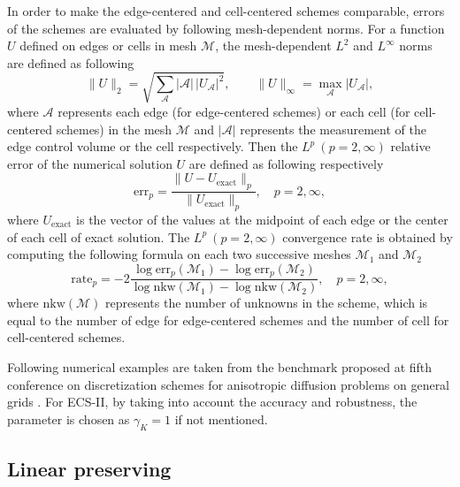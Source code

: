 \documentclass[times,review,preprint]{elsarticle}
\begin{document}
In order to make the edge-centered and cell-centered schemes comparable, errors of the schemes are evaluated by following mesh-dependent norms.
For a function $U$ defined on edges or cells in mesh $\mathcal{M}$, the mesh-dependent $L^2$ and $L^{\infty}$ norms are defined as following
\begin{equation}
\|U\|_{2} = \sqrt{ \sum_{\mathcal{A}} |\mathcal{A}| \, |U_{\mathcal{A}}|^2 }, \qquad \|U\|_{\infty} = \max_{\mathcal{A}} |U_{\mathcal{A}}|,
\end{equation}
where $\mathcal{A}$ represents each edge (for edge-centered schemes) or each cell (for cell-centered schemes) in the mesh $\mathcal{M}$ and $|\mathcal{A}|$ represents the measurement of the edge control volume or the cell respectively.
Then the $L^p \ (p = 2, \infty)$ relative error of the numerical solution $U$ are defined as following respectively
\begin{equation}
\text{err}_{p} = \frac{\|U - U_{\text{exact}}\|_{p}}{\|U_{\text{exact}}\|_{p}}, \quad p = 2, \infty,
\end{equation}
where $U_{\text{exact}}$ is the vector of the values at the midpoint of each edge or the center of each cell of exact solution.
The $L^p \ (p = 2, \infty)$ convergence rate is obtained by computing the following formula on each two successive meshes $\mathcal{M}_1$ and $\mathcal{M}_2$
\begin{equation}
\text{rate}_{p} = -2 \frac{\log \text{err}_{p}(\mathcal{M}_1) - \log \text{err}_{p}(\mathcal{M}_2)}{\log \text{nkw}(\mathcal{M}_1) - \log \text{nkw}(\mathcal{M}_2)}, \quad p = 2, \infty,
\end{equation}
where $\text{nkw}(\mathcal{M})$ represents the number of unknowns in the scheme, which is equal to the number of edge for edge-centered schemes and the number of cell for cell-centered schemes.

Following numerical examples are taken from the benchmark proposed at fifth conference on discretization schemes for anisotropic diffusion problems on general grids \cite{Herbin}. For ECS-II, by taking into account the accuracy and robustness, the parameter is chosen as $\gamma_K = 1$ if not mentioned.

\subsection{Linear preserving}
\end{document}
